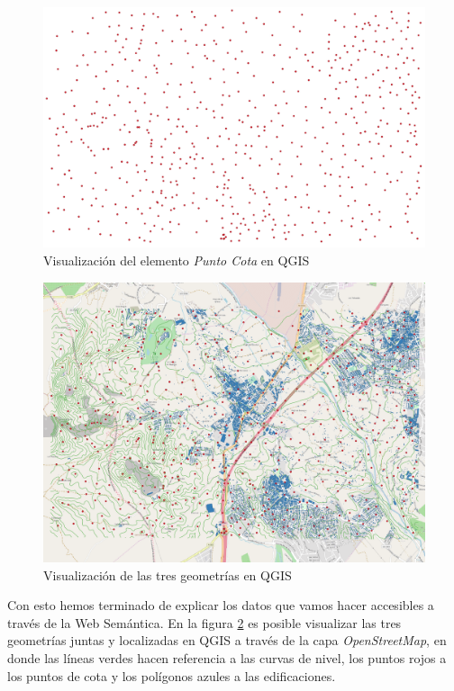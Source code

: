 \begin{enumerate}
	\begin{figure}[H]
		\centering
		\includegraphics[width=0.92\linewidth]{imagenes/capitulo5/puntocota}
		\caption{Visualización del elemento \textit{Punto Cota} en QGIS}
		\label{fig:puntocota}
	\end{figure}
\end{enumerate}

\begin{figure}[H]
	\centering
	\includegraphics[width=1\linewidth]{imagenes/capitulo5/mapa}
	\caption{Visualización de las tres geometrías en QGIS}
	\label{fig:mapa}
\end{figure}


Con esto hemos terminado de explicar los datos que vamos hacer accesibles a través de la Web Semántica. En la figura \ref{fig:mapa} es posible visualizar las tres geometrías juntas y localizadas en QGIS a través de la capa \textit{OpenStreetMap}, en donde las líneas verdes hacen referencia a las curvas de nivel, los puntos rojos a los puntos de cota y los polígonos azules a las edificaciones.\\

